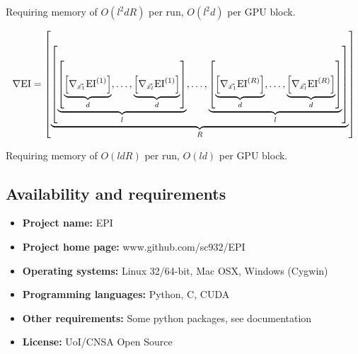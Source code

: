 \documentclass[index]{subfiles}
\begin{document}
Requiring memory of $O(l^{2}dR)$ per run, $O(l^{2}d)$ per GPU block.

\begin{equation}
    \nabla {\rm EI} = \left[ \underbrace{ \left[ \underbrace{ \left[ \underbrace{ \left[ \nabla_{\vec{x_{1}}} {\rm EI}^{(1)} \right]}_{d} , \ldots, \underbrace{ \left[ \nabla_{\vec{x_{l}}} {\rm EI}^{(1)} \right]}_{d}\right]}_{l}, \ldots, \underbrace{ \left[ \underbrace{ \left[ \nabla_{\vec{x_{1}}} {\rm EI}^{(R)} \right]}_{d} , \ldots, \underbrace{ \left[ \nabla_{\vec{x_{l}}} {\rm EI}^{(R)} \right]}_{d}\right]}_{l} \right]}_{R} \right]\end{equation}

Requiring memory of $O(ldR)$ per run, $O(ld)$ per GPU block.




\subsection{Availability and requirements}
 \begin{itemize}
  \item \textbf{Project name:} EPI
  \item \textbf{Project home page:} www.github.com/sc932/EPI
  \item \textbf{Operating systems:} Linux 32/64-bit, Mac OSX, Windows (Cygwin)
  \item \textbf{Programming languages:} Python, C, CUDA
  \item \textbf{Other requirements:} Some python packages, see documentation
  \item \textbf{License:} UoI/CNSA Open Source
 \end{itemize}



\end{document}
